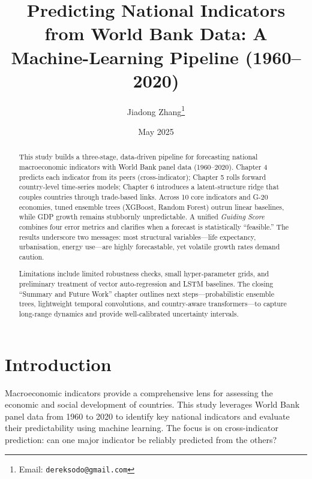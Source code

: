\documentclass[12pt]{article}
\title{Predicting National Indicators from World Bank Data: A Machine-Learning Pipeline (1960–2020)}
\author{Jiadong Zhang\thanks{Email: \texttt{dereksodo@gmail.com}}}
\date{May 2025}
\begin{document}
\maketitle

\begin{abstract}
This study builds a three-stage, data-driven pipeline for forecasting national macroeconomic indicators with World Bank panel data (1960–2020).  
Chapter 4 predicts each indicator from its peers (cross-indicator); Chapter 5 rolls forward country-level
time-series models; Chapter 6 introduces a latent-structure ridge that couples countries through trade-based links.
Across 10 core indicators and G-20 economies, tuned ensemble trees (XGBoost, Random Forest) outrun linear baselines, while GDP growth remains stubbornly unpredictable.  
A unified \emph{Guiding Score} combines four error metrics and clarifies when a forecast is statistically “feasible.”  
The results underscore two messages: most structural variables—life expectancy, urbanisation, energy use—are highly forecastable, yet volatile growth rates demand caution.

Limitations include limited robustness checks, small hyper-parameter grids, and preliminary treatment of vector auto-regression and LSTM baselines.  
The closing “Summary and Future Work” chapter outlines next steps—probabilistic ensemble trees, lightweight temporal convolutions, and country-aware transformers—to capture long-range dynamics and provide well-calibrated uncertainty intervals.
\end{abstract}

\newpage
\tableofcontents
\newpage


\section{Introduction}

Macroeconomic indicators provide a comprehensive lens for assessing the economic and social development of countries. This study leverages World Bank panel data from 1960 to 2020 to identify key national indicators and evaluate their predictability using machine learning. The focus is on cross-indicator prediction: can one major indicator be reliably predicted from the others?
\end{document}
